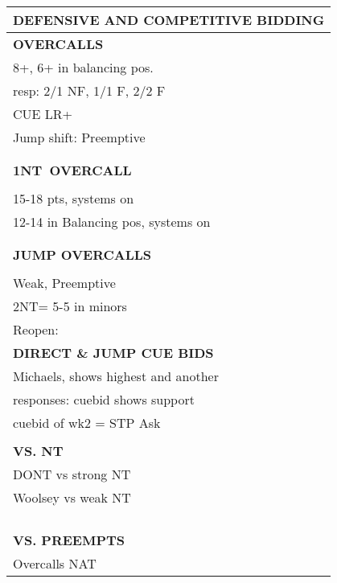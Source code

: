 \documentclass{article}
\newcommand\N{{\footnotesize NT}}
\begin{document}
\noindent
\small{
\begin{minipage}{90mm}
	\begin{tabular}{| p{88mm} |}
		\hline
		\cellcolor[gray]{0.9} \textbf{DEFENSIVE AND COMPETITIVE BIDDING} \\ \hline
		\textbf{OVERCALLS} \\ \hline
                8+, 6+ in balancing pos.
		\\ \hline
                resp: 2/1 NF, 1/1 F, 2/2 F
		\\ \hline
                CUE LR+
		\\ \hline
                Jump shift: Preemptive
		\\ \hline
		\\ \hline
		\\ \hline
		\textbf{1\N \ OVERCALL} \\ \hline
		\\ \hline
                15-18 pts, systems on
		\\ \hline
                12-14 in Balancing pos, systems on
		\\ \hline
		\\ \hline
		\\ \hline
		\textbf{JUMP OVERCALLS} \\ \hline
		\\ \hline
                Weak, Preemptive
		\\ \hline
                2NT= 5-5 in minors
		\\ \hline
		Reopen: \\ \hline
		\textbf{DIRECT \& JUMP CUE BIDS} \\ \hline
                Michaels, shows highest and another
		\\ \hline
                responses: cuebid shows support
		\\ \hline
                cuebid of wk2 = STP Ask 
		\\ \hline
		\\ \hline
		\textbf{VS. NT} \\ \hline
                DONT vs strong NT
		\\ \hline
                Woolsey vs weak NT
		\\ \hline
		\\ \hline
		\\ \hline
		\\ \hline
		\\ \hline
		\textbf{VS. PREEMPTS} \\ \hline
                Overcalls NAT
		\\ \hline

\end{tabular}
\end{minipage}}
\end{document}
